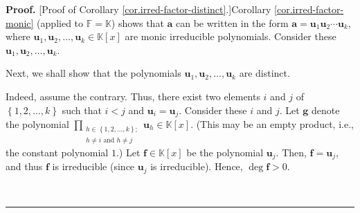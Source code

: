 \documentclass[numbers=enddot,12pt,final,onecolumn,notitlepage]{scrartcl}%
\theoremstyle{definition}
\newenvironment{proof}[1][Proof]{\noindent\textbf{#1.} }{\ \rule{0.5em}{0.5em}}
\let\prodnonlimits\prod
\renewcommand{\prod}{\prodnonlimits\limits}
\begin{document}
\begin{proof}
[Proof of Corollary \ref{cor.irred-factor-distinct}.]Corollary
\ref{cor.irred-factor-monic} (applied to $\mathbb{F}=\mathbb{K}$) shows that
$\mathbf{a}$ can be written in the form $\mathbf{a}=\mathbf{u}_{1}%
\mathbf{u}_{2}\cdots\mathbf{u}_{k}$, where $\mathbf{u}_{1},\mathbf{u}%
_{2},\ldots,\mathbf{u}_{k}\in\mathbb{K}\left[  x\right]  $ are monic
irreducible polynomials. Consider these $\mathbf{u}_{1},\mathbf{u}_{2}%
,\ldots,\mathbf{u}_{k}$.

Next, we shall show that the polynomials $\mathbf{u}_{1},\mathbf{u}_{2}%
,\ldots,\mathbf{u}_{k}$ are distinct.

Indeed, assume the contrary. Thus, there exist two elements $i$ and $j$ of
$\left\{  1,2,\ldots,k\right\}  $ such that $i<j$ and $\mathbf{u}%
_{i}=\mathbf{u}_{j}$. Consider these $i$ and $j$. Let $\mathbf{g}$ denote the
polynomial $\prod_{\substack{h\in\left\{  1,2,\ldots,k\right\}  ;\\h\neq
i\text{ and }h\neq j}}\mathbf{u}_{h}\in\mathbb{K}\left[  x\right]  $. (This
may be an empty product, i.e., the constant polynomial $1$.) Let
$\mathbf{f}\in\mathbb{K}\left[  x\right]  $ be the polynomial $\mathbf{u}_{j}%
$. Then, $\mathbf{f}=\mathbf{u}_{j}$, and thus $\mathbf{f}$ is irreducible
(since $\mathbf{u}_{j}$ is irreducible). Hence, $\deg\mathbf{f}>0$.


\end{proof}
\end{document}
